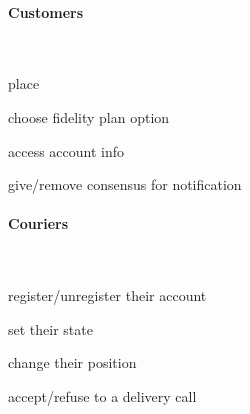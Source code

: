 \paragraph*{Customers}~\vspace{0.3\baselineskip}
\begin{itemize}
  \begin{minipage}{0.47\linewidth}
    \item place \Order
    \item choose fidelity plan option
  \end{minipage}
  \begin{minipage}{0.53\linewidth}
    \item access account info
    \item give/remove consensus for notification
  \end{minipage}
\end{itemize}

\paragraph*{Couriers}~\vspace{0.3\baselineskip}
\begin{itemize}
  \begin{minipage}{0.47\linewidth}
    \item register/unregister their account
    \item set their state
  \end{minipage}
  \begin{minipage}{0.53\linewidth}
    \item change their position
    \item accept/refuse to a delivery call
  \end{minipage}
\end{itemize}


